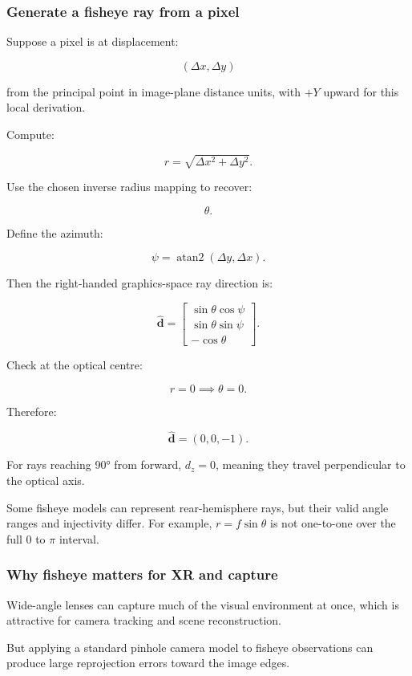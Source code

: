 \subsubsection{Generate a fisheye ray from a pixel}\label{generate-a-fisheye-ray-from-a-pixel}

Suppose a pixel is at displacement:

\[ (\Delta x,\Delta y) \]

from the principal point in image-plane distance units, with \(+Y\) upward for this local derivation.

Compute:

\[ r=\sqrt{\Delta x^2+\Delta y^2}. \]

Use the chosen inverse radius mapping to recover:

\[ \theta. \]

Define the azimuth:

\[ \psi=\operatorname{atan2}(\Delta y,\Delta x). \]

Then the right-handed graphics-space ray direction is:

\[ \boxed{ \hat{\mathbf d}= \begin{bmatrix} \sin\theta\cos\psi\\ \sin\theta\sin\psi\\ -\cos\theta \end{bmatrix}. } \]

Check at the optical centre:

\[ r=0\implies\theta=0. \]

Therefore:

\[ \hat{\mathbf d}=(0,0,-1). \]

For rays reaching 90° from forward, \(d_z=0\), meaning they travel perpendicular to the optical axis.

Some fisheye models can represent rear-hemisphere rays, but their valid angle ranges and injectivity differ. For example, \(r=f\sin\theta\) is not one-to-one over the full \(0\) to \(\pi\) interval.

\subsubsection{Why fisheye matters for XR and capture}\label{why-fisheye-matters-for-xr-and-capture}

Wide-angle lenses can capture much of the visual environment at once, which is attractive for camera tracking and scene reconstruction.

But applying a standard pinhole camera model to fisheye observations can produce large reprojection errors toward the image edges.

